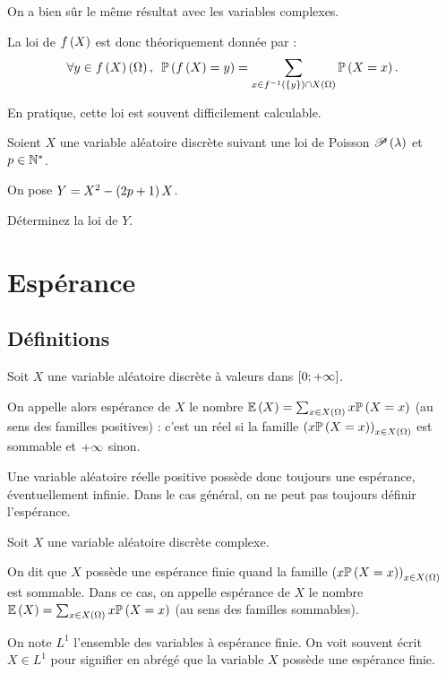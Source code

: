 On a bien sûr le même résultat avec les variables complexes.

La loi de \(f\left(X\right)\) est donc théoriquement donnée par : \[\quantifs{\forall y\in f\paren{X}\paren{\Omega}}\proba{f\paren{X}=y}=\sum_{x\in f\inv\paren{\accol{y}}\inter X\paren{\Omega}}\proba{X=x}.\]

En pratique, cette loi est souvent difficilement calculable.

\begin{exo}
Soient \(X\) une variable aléatoire discrète suivant une loi de Poisson \(\mathscr{P}\left(\lambda\right)\) et \(p\in\mathbb{N}^*\).

On pose \(Y=X^2-\left(2p+1\right)X\).

Déterminez la loi de \(Y\).
\end{exo}

\section{Espérance}

\subsection{Définitions}

\begin{defi}
Soit \(X\) une variable aléatoire discrète à valeurs dans \(\left[0;+\infty\right]\).

On appelle alors espérance de \(X\) le nombre \(\operatorname{\mathbb{E}}\left(X\right)=\sum_{x\in X\left(\Omega\right)}x\mathbb{P}\left(X=x\right)\) (au sens des familles positives) : c'est un réel si la famille \(\left(x\mathbb{P}\left(X=x\right)\right)_{x\in X\left(\Omega\right)}\) est sommable et \(+\infty\) sinon.
\end{defi}

Une variable aléatoire réelle positive possède donc toujours une espérance, éventuellement infinie. Dans le cas général, on ne peut pas toujours définir l'espérance.

\begin{defi}
Soit \(X\) une variable aléatoire discrète complexe.

On dit que \(X\) possède une espérance finie quand la famille \(\left(x\mathbb{P}\left(X=x\right)\right)_{x\in X\left(\Omega\right)}\) est sommable. Dans ce cas, on appelle espérance de \(X\) le nombre \(\operatorname{\mathbb{E}}\left(X\right)=\sum_{x\in X\left(\Omega\right)}x\mathbb{P}\left(X=x\right)\) (au sens des familles sommables).
\end{defi}

On note \(L^1\) l'ensemble des variables à espérance finie. On voit souvent écrit \(X\in L^1\) pour signifier en abrégé que la variable \(X\) possède une espérance finie.

